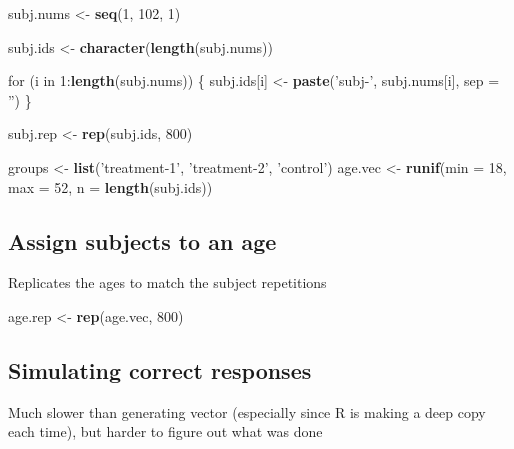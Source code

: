 \documentclass[]{article}
\newenvironment{Shaded}{\begin{snugshade}}{\end{snugshade}}
\newcommand{\KeywordTok}[1]{\textcolor[rgb]{0.13,0.29,0.53}{\textbf{{#1}}}}
\newcommand{\DataTypeTok}[1]{\textcolor[rgb]{0.13,0.29,0.53}{{#1}}}
\newcommand{\DecValTok}[1]{\textcolor[rgb]{0.00,0.00,0.81}{{#1}}}
\newcommand{\StringTok}[1]{\textcolor[rgb]{0.31,0.60,0.02}{{#1}}}
\newcommand{\NormalTok}[1]{{#1}}
\begin{document}
\begin{Shaded}
\begin{Highlighting}[]
\NormalTok{subj.nums <-}\StringTok{ }\KeywordTok{seq}\NormalTok{(}\DecValTok{1}\NormalTok{, }\DecValTok{102}\NormalTok{, }\DecValTok{1}\NormalTok{)}

\NormalTok{subj.ids <-}\StringTok{ }\KeywordTok{character}\NormalTok{(}\KeywordTok{length}\NormalTok{(subj.nums))}

\NormalTok{for (i in }\DecValTok{1}\NormalTok{:}\KeywordTok{length}\NormalTok{(subj.nums)) \{}
  \NormalTok{subj.ids[i] <-}\StringTok{ }\KeywordTok{paste}\NormalTok{(}\StringTok{'subj-'}\NormalTok{, subj.nums[i], }\DataTypeTok{sep =} \StringTok{''}\NormalTok{)}
\NormalTok{\}}

\NormalTok{subj.rep <-}\StringTok{ }\KeywordTok{rep}\NormalTok{(subj.ids, }\DecValTok{800}\NormalTok{)}

\NormalTok{groups <-}\StringTok{ }\KeywordTok{list}\NormalTok{(}\StringTok{'treatment-1'}\NormalTok{, }\StringTok{'treatment-2'}\NormalTok{, }\StringTok{'control'}\NormalTok{)}
\NormalTok{age.vec <-}\StringTok{ }\KeywordTok{runif}\NormalTok{(}\DataTypeTok{min =} \DecValTok{18}\NormalTok{, }\DataTypeTok{max =} \DecValTok{52}\NormalTok{, }\DataTypeTok{n =} \KeywordTok{length}\NormalTok{(subj.ids))}
\end{Highlighting}
\end{Shaded}

\subsection{Assign subjects to an age}\label{assign-subjects-to-an-age}

Replicates the ages to match the subject repetitions

\begin{Shaded}
\begin{Highlighting}[]
\NormalTok{age.rep <-}\StringTok{ }\KeywordTok{rep}\NormalTok{(age.vec, }\DecValTok{800}\NormalTok{)}
\end{Highlighting}
\end{Shaded}

\subsection{Simulating correct
responses}\label{simulating-correct-responses}

Much slower than generating vector (especially since R is making a deep
copy each time), but harder to figure out what was done
\end{document}
